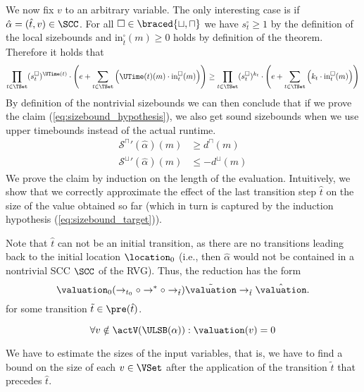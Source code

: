We now fix $v$ to an arbitrary variable.
The only interesting case is if $\hat{\alpha} = (\hat{t}, v) \in \SCC$.
For all $\square \in \braced{\sqcup, \sqcap}$ we have $s^\square_t \geq 1$ by the definition of the local sizebounds and $\text{in}^\square_{\hat{t}}(m) \geq 0$ holds by definition of the theorem.
Therefore it holds that
\[ \prod_{t \in \TSet} (s^\square_t)^{\UTime(t)} \cdot \left( e + \sum_{t \in \TSet} \left( \UTime(t)(m) \cdot \text{in}^\square_t(m) \right) \right) \geq \prod_{t \in \TSet} (s^\square_t)^{k_t} \cdot \left( e + \sum_{t \in \TSet} \left( k_t \cdot \text{in}^\square_t(m) \right) \right) \]
By definition of the nontrivial sizebounds we can then conclude that if we prove the claim (\ref{eq:sizebound_hypothesis}), we also get sound sizebounds when we use upper timebounds instead of the actual runtime.
\begin{equation}
  \begin{split}
    {\mathcal{S}^\sqcap}'(\hat{\alpha})(m) & \geq d^\sqcap(m) \\
    {\mathcal{S}^\sqcup}'(\hat{\alpha})(m) & \leq -d^\sqcup(m)
  \end{split}
\end{equation}
We prove the claim by induction on the length of the evaluation.
Intuitively, we show that we correctly approximate the effect of the last transition step $\hat{t}$ on the size of the value obtained so far (which in turn is captured by the induction hypothesis (\ref{eq:sizebound_target})).

Note that $\hat{t}$ can not be an initial transition, as there are no transitions leading back to the initial location $\location_0$
(i.e., then $\hat{\alpha}$ would not be contained in a nontrivial SCC $\SCC$ of the RVG).
Thus, the reduction has the form
\[ \valuation_0 (\rightarrow_{t_0} \circ \rightarrow^* \circ \rightarrow_{\tilde{t}}) \tilde{\valuation} \rightarrow_{\hat{t}} \hat{\valuation}. \]
for some transition $\tilde{t} \in \pre(\hat{t})$.

\begin{equation} \label{eq:nonactiveequalzero}
  \forall v \notin \actV(\ULSB(\alpha)): \valuation(v) = 0
\end{equation}

We have to estimate the sizes of the input variables,
that is, we have to find a bound on the size of each $v \in \VSet$ after the application of the transition $\tilde{t}$ that precedes $\hat{t}$.

